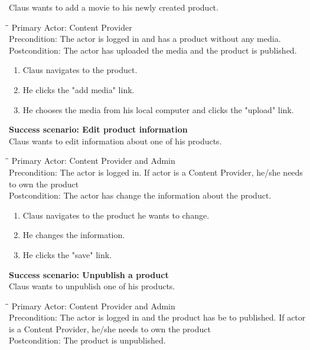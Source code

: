 Claus wants to add a movie to his newly created product.
\begin{tabbing}
\hspace{5mm}\=\hspace{26mm}\=\kill
\>Primary Actor:\> Content Provider\\
\>Precondition:\> The actor is logged in and has a product without any media.\\
\>Postcondition:\> The actor has uploaded the media and the product is published.
\end{tabbing}
\begin{enumerate} \setlength{\itemsep}{-1mm}
	\item Claus navigates to the product.
	\item He clicks the "add media" link.
	\item He chooses the media from his local computer and clicks the "upload" link.
\end{enumerate}
\vspace{3mm}
\textbf{Success scenario: Edit product information} \\
Claus wants to edit information about one of his products.
\begin{tabbing}
\hspace{5mm}\=\hspace{26mm}\=\kill
\>Primary Actor:\> Content Provider and Admin\\
\>Precondition:\> The actor is logged in. If actor is a Content Provider, he/she needs to own the product\\
\>Postcondition:\> The actor has change the information about the product.
\end{tabbing}
\begin{enumerate} \setlength{\itemsep}{-1mm}
	\item Claus navigates to the product he wants to change.
	\item He changes the information.
	\item He clicks the "save" link.
\end{enumerate}
\vspace{3mm}
\textbf{Success scenario: Unpublish a product} \\
Claus wants to unpublish one of his products.
\begin{tabbing}
\hspace{5mm}\=\hspace{26mm}\=\kill
\>Primary Actor:\> Content Provider and Admin\\
\>Precondition:\> The actor is logged in and the product has be to published. If actor is a Content Provider, he/she needs to own the product\\
\>Postcondition:\> The product is unpublished.
\end{tabbing}
